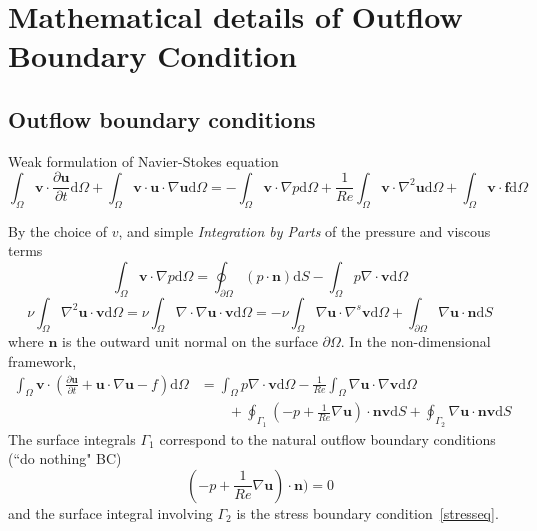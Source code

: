 
\chapter{Mathematical details of Outflow Boundary Condition} %

\label{AppendixC} %


\section{Outflow boundary conditions}\label{out}
Weak formulation of Navier-Stokes equation
\begin{equation}
\int_{\Omega} \pmb{v}\cdot \frac{\partial \pmb{u}}{\partial t}\mbox{d} \Omega +  \int_{\Omega} \pmb{v}\cdot \pmb{u} \cdot \nabla \pmb{u}\mbox{d} \Omega = -\int_{\Omega} \pmb{v}\cdot \nabla p\mbox{d} \Omega + \frac{1}{Re} \int_{\Omega} \pmb{v}\cdot \nabla ^{2} \pmb{u}\mbox{d} \Omega + \int_{\Omega} \pmb{v}\cdot \pmb{f}\mbox{d} \Omega
\end{equation}

By the choice of $v$, and simple \textit{Integration by Parts} of the pressure and viscous terms
\begin{equation}
\int_{\Omega} \pmb{v}\cdot \nabla p\mbox{d} \Omega = \oint_{\partial \Omega} \left(p \cdot \pmb{n}\right) \mbox{d}S - \int_{\Omega} p  \nabla \cdot \pmb{v}\mbox{d} \Omega
\end{equation}
\begin{equation}
 \nu\int_{\Omega} \nabla^{2}\pmb{u}\cdot \pmb{v} \mbox{d}\Omega = \nu\int_{\Omega}  \nabla \cdot \nabla \pmb{u} \cdot \pmb{v} \mbox{d}\Omega = -  \nu\int_{\Omega}  \nabla \pmb{u} \cdot \nabla^{s} \pmb{v} \mbox{d}\Omega + \int_{\partial \Omega} \nabla \pmb{u} \cdot \pmb{n} \mathrm{d}S
\end{equation}
where $\pmb{n}$ is the outward unit normal on the surface $\partial \Omega$.
In the non-dimensional framework,
\begin{equation}
\begin{split}
\int_{\Omega} \pmb{v} \cdot (\frac{\partial \pmb{u}}{\partial t} + \pmb{u} \cdot \nabla \pmb{u} -f)\mbox{d} \Omega & = \int_{\Omega} p \nabla \cdot \pmb{v}\mbox{d} \Omega - \frac{1}{Re}\int_{\Omega}\nabla \pmb{u} \cdot \nabla \pmb{v} \mbox{d} \Omega  \\
&\qquad + \oint_{\Gamma_1} (-p + \frac{1}{Re}\nabla  \pmb{u})\cdot \pmb{n}\pmb{v}\mbox{d} S + \oint_{\Gamma_2} \nabla \pmb{u}\cdot \pmb{n}\pmb{v}\mbox{d}S  \label{outflow_1}
\end{split}
\end{equation}
The surface integrals $\Gamma_1$ correspond to the natural outflow boundary conditions (``do nothing" BC) $$ (-p + \frac{1}{Re}\nabla  \pmb{u})\cdot \pmb{n}) = 0 $$ and the surface integral involving $\Gamma_2$ is the stress boundary condition~\ref{stresseq}.

